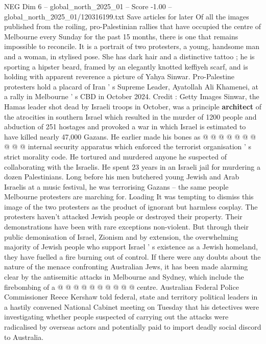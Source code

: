 \begin{textsample}{NEG Dim 6 – global\_north\_2025\_01 – Score -1.00 – global\_north\_2025\_01/120316199.txt}  \label{ex:f6_neg_101}
Save articles for later Of all the images published from the roiling, pro-Palestinian rallies that have occupied the centre of Melbourne every Sunday for the past 15 months, there is one that remains impossible to reconcile.
It is a portrait of two protesters, a young, handsome man and a woman, in stylised pose.
She has dark hair and a distinctive tattoo ; he is sporting a hipster beard, framed by an elegantly knotted keffiyeh scarf, and is holding with apparent reverence a picture of Yahya Sinwar.
Pro-Palestine protesters hold a placard of Iran ' s Supreme Leader, Ayatollah Ali Khamenei, at a rally in Melbourne ' s CBD in October 2024.
Credit : Getty Images Sinwar, the Hamas leader shot dead by Israeli troops in October, was a principle \textbf{architect} of the atrocities in southern Israel which resulted in the murder of 1200 people and abduction of 251 hostages and provoked a war in which Israel is estimated to have killed nearly 47,000 Gazans.
He earlier made his bones as @ @ @ @ @ @ @ @ @ @ internal security apparatus which enforced the terrorist organisation ' s strict morality code.
He tortured and murdered anyone he suspected of collaborating with the Israelis.
He spent 23 years in an Israeli jail for murdering a dozen Palestinians.
Long before his men butchered young Jewish and Arab Israelis at a music festival, he was terrorising Gazans -- the same people Melbourne protesters are marching for.
Loading It was tempting to dismiss this image of the two protesters as the product of ignorant but harmless cosplay.
The protesters haven't attacked Jewish people or destroyed their property.
Their demonstrations have been with rare exceptions non-violent.
But through their public demonisation of Israel, Zionism and by extension, the overwhelming majority of Jewish people who support Israel ' s existence as a Jewish homeland, they have fuelled a fire burning out of control.
If there were any doubts about the nature of the menace confronting Australian Jews, it has been made alarming clear by the antisemitic attacks in Melbourne and Sydney, which include the firebombing of a @ @ @ @ @ @ @ @ @ @ centre.
Australian Federal Police Commissioner Reece Kershaw told federal, state and territory political leaders in a hastily convened National Cabinet meeting on Tuesday that his detectives were investigating whether people suspected of carrying out the attacks were radicalised by overseas actors and potentially paid to import deadly social discord to Australia.

\end{textsample}
